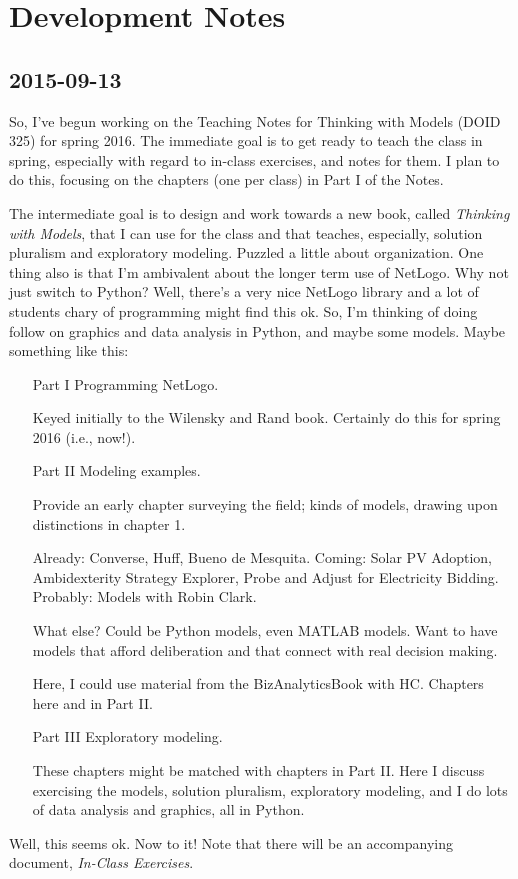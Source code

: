 \chapter{Development Notes\label{ch:dev_notes}}



\section{2015-09-13}

So, I've begun working on the Teaching Notes for Thinking with Models (DOID 325) for spring 2016. The immediate goal is to get ready to teach the class in spring, especially with regard to in-class exercises, and notes for them. I plan to do this, focusing on the chapters (one per class) in Part I of the Notes. 

The intermediate goal is to design and work towards a new book, called {\it Thinking with Models}, that I can use for the class and that teaches, especially, solution pluralism and exploratory modeling. Puzzled a little about organization. One thing also is that I'm ambivalent about the longer term use of NetLogo. Why not just switch to Python? Well, there's a very nice NetLogo library and a lot of students chary of programming might find this ok. So, I'm thinking of doing follow on graphics and data analysis in Python, and maybe some models. Maybe something like this:

\begin{enumerate}
\item[Part I]  Programming NetLogo. 

Keyed initially to the Wilensky and Rand book. Certainly do this for spring 2016 (i.e., now!).

\item[Part II] Modeling examples.

Provide an early chapter surveying the field; kinds of models, drawing upon distinctions in chapter 1.

Already: Converse, Huff, Bueno de Mesquita. Coming: Solar PV Adoption, Ambidexterity Strategy Explorer, Probe and Adjust for Electricity Bidding. Probably: Models with Robin Clark.

What else? Could be Python models, even MATLAB models. Want to have models that afford deliberation and that connect with real decision making.

Here, I could use material from the BizAnalyticsBook with HC. Chapters here and in Part II.

\item[Part III] Exploratory modeling.

These chapters might be matched with chapters in Part II. Here I discuss exercising the models, solution pluralism, exploratory modeling, and I do lots of data analysis and graphics, all in Python.
\end{enumerate}
Well, this seems ok. Now to it! Note that there will be an accompanying document, {\it In-Class Exercises}.